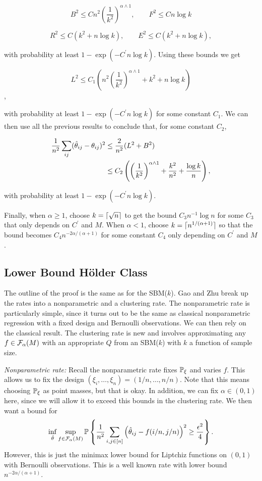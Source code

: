 \documentclass[11pt]{article}
\begin{document}
\[ B^2 \leq Cn^2 \left(\frac{1}{k^2}\right)^{\alpha \wedge 1}, \qquad F^2 \leq Cn\log k   \]

\[ R^2 \leq C(k^2 + n\log k), \qquad E^2 \leq C(k^2 + n\log k),   \]

with probability at least $1-\exp(-C^\prime n \log k)$. Using these bounds we get

\[ L^2 \leq C_1 \left( n^2 \left( \frac{1}{k^2} \right)^{\alpha \wedge 1} + k^2 + n\log k  \right)  \],

with probability at least $1-\exp(-C^\prime n \log k)$ for some constant $C_1$. We can then use all the previous results to conclude that, for some constant $C_2$,

\begin{align*}
    \frac{1}{n^2} \sum_{ij}(\hat{\theta}_{ij}-\theta_{ij})^2 & \leq \frac{2}{n^2}(L^2 + B^2) \\
    & \leq C_2 \left( \left( \frac{1}{k^2} \right)^{\alpha \wedge 1} + \frac{k^2}{n^2} + \frac{\log k}{n} \right),
\end{align*}

with probability at least $1-\exp(-C^\prime n \log k)$.

Finally, when $\alpha \geq 1$, choose $k = \lceil\sqrt{n}\rceil $ to get the bound $C_3n^{-1}\log n$ for some $C_3$ that only depends on $C^\prime$ and $M$. When $\alpha < 1$, choose $k = \lceil n^{1/(\alpha+1)}\rceil$ so that the bound becomes $C_4n^{-2\alpha/(\alpha+1)}$ for some constant $C_4$ only depending on $C^\prime$ and $M$.

\subsection{Lower Bound H\"older Class} \label{sec:lower_hold}

The outline of the proof is the same as for the SBM($k$). Gao and Zhu break up the rates into a nonparametric and a clustering rate. The nonparametric rate is particularly simple, since it turns out to be the same as classical nonparametric regression with a fixed design and Bernoulli observations. We can then rely on the classical result. The clustering rate is new and involves approximating any $f \in \mathcal{F}_{\alpha}(M)$ with an appropriate $Q$ from an SBM($k$) with $k$ a function of sample size.

\textit{Nonparametric rate:} Recall the nonparametric rate fixes $\mathbb{P}_{\xi}$ and varies $f$. This allows us to fix the design $(\xi_i, \dots, \xi_n) = (1/n, \dots, n/n)$. Note that this means choosing $\mathbb{P}_{\xi}$ as point masses, but that is okay. In addition, we can fix $\alpha \in (0, 1)$ here, since we will allow it to exceed this bounds in the clustering rate. We then want a bound for
\begin{equation}
\inf_{\hat{\theta}}\sup_{f \in \mathcal{F}_{\alpha}(M)} \mathbb{P} \left\{\frac{1}{n^2} \sum_{i,j \in \lbrack n\rbrack} \left(\hat{\theta}_{ij} - f(i/n, j/n)\right)^2 \geq \frac{\epsilon^2}{4}\right\}.
\end{equation}
However, this is just the minimax lower bound for Liptchiz functions on $(0, 1)$ with Bernoulli observations. This is a well known rate with lower bound $n^{-2\alpha/(\alpha + 1)}$.
\end{document}
